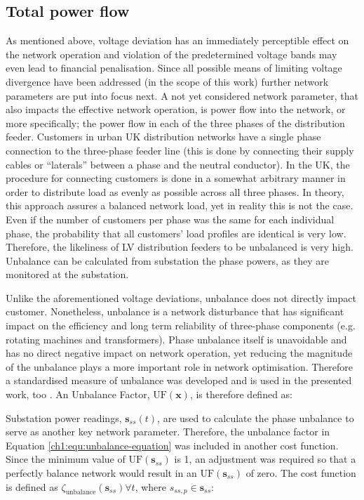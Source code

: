 

\subsection{Total power flow}
\label{ch1:subsec:total-power-flow}

As mentioned above, voltage deviation has an immediately perceptible effect on the network operation and violation of the predetermined voltage bands may even lead to financial penalisation.
Since all possible means of limiting voltage divergence have been addressed (in the scope of this work) further network parameters are put into focus next.
A not yet considered network parameter, that also impacts the effective network operation, is power flow into the network, or more specifically; the power flow in each of the three phases of the distribution feeder.
Customers in urban UK distribution networks have a single phase connection to the three-phase feeder line (this is done by connecting their supply cables or ``laterals'' between a phase and the neutral conductor).
In the UK, the procedure for connecting customers is done in a somewhat arbitrary manner in order to distribute load as evenly as possible across all three phases.
In theory, this approach assures a balanced network load, yet in reality this is not the case.
Even if the number of customers per phase was the same for each individual phase, the probability that all customers' load profiles are identical is very low.
Therefore, the likeliness of LV distribution feeders to be unbalanced is very high.
Unbalance can be calculated from substation the phase powers, as they are monitored at the substation.

Unlike the aforementioned voltage deviations, unbalance does not directly impact customer.
Nonetheless, unbalance is a network disturbance that has significant impact on the efficiency and long term reliability of three-phase components (e.g. rotating machines and transformers).
Phase unbalance itself is unavoidable and has no direct negative impact on network operation, yet reducing the magnitude of the unbalance plays a more important role in network optimisation.
Therefore a standardised measure of unbalance was developed and is used in the presented work, too \cite{ANSI-MB-1-2011}.
An Unbalance Factor, $\text{UF}(\textbf{x})$, is therefore defined as:



Substation power readings, $\textbf{s}_{ss}(t)$, are used to calculate the phase unbalance to serve as another key network parameter.
Therefore, the unbalance factor in Equation \ref{ch1:equ:unbalance-equation} was included in another cost function.
Since the minimum value of $\text{UF}(\textbf{s}_{ss})$ is 1, an adjustment was required so that a perfectly balance network would result in an $\text{UF}(\textbf{s}_{ss})$ of zero.
The cost function is defined as $\zeta_\text{unbalance}(\textbf{s}_{ss}) \forall t$,  where $s_{ss,p} \in \textbf{s}_{ss}$:

